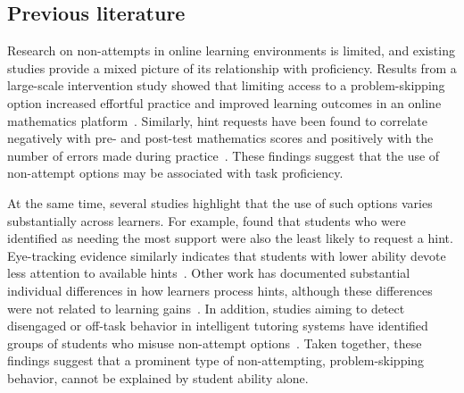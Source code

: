 \documentclass[11pt]{article}
\begin{document}

\subsection{Previous literature}
Research on non-attempts in online learning environments is limited, and existing studies provide a mixed picture of its relationship with proficiency. Results from a large-scale intervention study showed that limiting access to a problem-skipping option increased effortful practice and improved learning outcomes in an online mathematics platform~\parencite{savi2018delaying, savi2023combating}. Similarly, hint requests have been found to correlate negatively with pre- and post-test mathematics scores and positively with the number of errors made during practice~\parencite{norum2024student}. These findings suggest that the use of non-attempt options may be associated with task proficiency. 

At the same time, several studies highlight that the use of such options varies substantially across learners. For example, \textcite{norum2024student} found that students who were identified as needing the most support were also the least likely to request a hint. Eye-tracking evidence similarly indicates that students with lower ability devote less attention to available hints~\parencite{conati2013understanding}. Other work has documented substantial individual differences in how learners process hints, although these differences were not related to learning gains~\parencite{goldin2012learner, goldin2013hints}. In addition, studies aiming to detect disengaged or off-task behavior in intelligent tutoring systems have identified groups of students who misuse non-attempt options~\parencite{baker2004off, baker2004detecting, baker2005performance, beck2004using}. Taken together, these findings suggest that a prominent type of non-attempting, problem-skipping behavior, cannot be explained by student ability alone.
\end{document}
